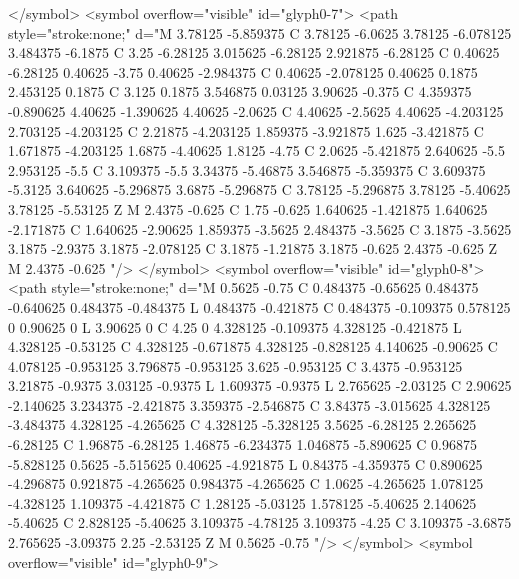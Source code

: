 </symbol>
<symbol overflow="visible" id="glyph0-7">
<path style="stroke:none;" d="M 3.78125 -5.859375 C 3.78125 -6.0625 3.78125 -6.078125 3.484375 -6.1875 C 3.25 -6.28125 3.015625 -6.28125 2.921875 -6.28125 C 0.40625 -6.28125 0.40625 -3.75 0.40625 -2.984375 C 0.40625 -2.078125 0.40625 0.1875 2.453125 0.1875 C 3.125 0.1875 3.546875 0.03125 3.90625 -0.375 C 4.359375 -0.890625 4.40625 -1.390625 4.40625 -2.0625 C 4.40625 -2.5625 4.40625 -4.203125 2.703125 -4.203125 C 2.21875 -4.203125 1.859375 -3.921875 1.625 -3.421875 C 1.671875 -4.203125 1.6875 -4.40625 1.8125 -4.75 C 2.0625 -5.421875 2.640625 -5.5 2.953125 -5.5 C 3.109375 -5.5 3.34375 -5.46875 3.546875 -5.359375 C 3.609375 -5.3125 3.640625 -5.296875 3.6875 -5.296875 C 3.78125 -5.296875 3.78125 -5.40625 3.78125 -5.53125 Z M 2.4375 -0.625 C 1.75 -0.625 1.640625 -1.421875 1.640625 -2.171875 C 1.640625 -2.90625 1.859375 -3.5625 2.484375 -3.5625 C 3.1875 -3.5625 3.1875 -2.9375 3.1875 -2.078125 C 3.1875 -1.21875 3.1875 -0.625 2.4375 -0.625 Z M 2.4375 -0.625 "/>
</symbol>
<symbol overflow="visible" id="glyph0-8">
<path style="stroke:none;" d="M 0.5625 -0.75 C 0.484375 -0.65625 0.484375 -0.640625 0.484375 -0.484375 L 0.484375 -0.421875 C 0.484375 -0.109375 0.578125 0 0.90625 0 L 3.90625 0 C 4.25 0 4.328125 -0.109375 4.328125 -0.421875 L 4.328125 -0.53125 C 4.328125 -0.671875 4.328125 -0.828125 4.140625 -0.90625 C 4.078125 -0.953125 3.796875 -0.953125 3.625 -0.953125 C 3.4375 -0.953125 3.21875 -0.9375 3.03125 -0.9375 L 1.609375 -0.9375 L 2.765625 -2.03125 C 2.90625 -2.140625 3.234375 -2.421875 3.359375 -2.546875 C 3.84375 -3.015625 4.328125 -3.484375 4.328125 -4.265625 C 4.328125 -5.328125 3.5625 -6.28125 2.265625 -6.28125 C 1.96875 -6.28125 1.46875 -6.234375 1.046875 -5.890625 C 0.96875 -5.828125 0.5625 -5.515625 0.40625 -4.921875 L 0.84375 -4.359375 C 0.890625 -4.296875 0.921875 -4.265625 0.984375 -4.265625 C 1.0625 -4.265625 1.078125 -4.328125 1.109375 -4.421875 C 1.28125 -5.03125 1.578125 -5.40625 2.140625 -5.40625 C 2.828125 -5.40625 3.109375 -4.78125 3.109375 -4.25 C 3.109375 -3.6875 2.765625 -3.09375 2.25 -2.53125 Z M 0.5625 -0.75 "/>
</symbol>
<symbol overflow="visible" id="glyph0-9">
